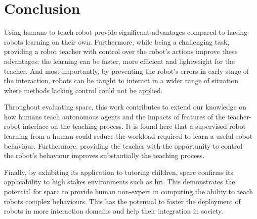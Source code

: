 \section{Conclusion}\label{sec:conc_conc}

Using humans to teach robot provide significant advantages compared to having robots learning on their own. Furthermore, while being a challenging task, providing a robot teacher with control over the robot's actions improve these advantages: the learning can be faster, more efficient and lightweight for the teacher. And most importantly, by preventing the robot's errors in early stage of the interaction, robots can be taught to interact in a wider range of situation where methods lacking control could not be applied.

Throughout evaluating \gls{sparc}, this work contributes to extend our knowledge on how humans teach autonomous agents and the impacts of features of the teacher-robot interface on the teaching process. It is found here that a supervised robot learning from a human could reduce the workload required to learn a useful robot behaviour. Furthermore, providing the teacher with the opportunity to control the robot's behaviour improves substantially the teaching process.

Finally, by exhibiting its application to tutoring children, \gls{sparc} confirms its applicability to high stakes environments such as \gls{hri}. This demonstrates the potential for \gls{sparc} to provide human non-expert in computing the ability to teach robots complex behaviours. This has the potential to foster the deployment of robots in more interaction domains and help their integration in society.